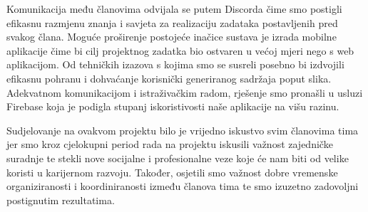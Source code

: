Komunikacija među članovima odvijala se putem Discorda čime smo postigli efikasnu razmjenu znanja i savjeta za realizaciju zadataka postavljenih pred svakog člana. Moguće proširenje postojeće inačice sustava je izrada mobilne aplikacije čime bi cilj projektnog zadatka
bio ostvaren u većoj mjeri nego s web aplikacijom. Od tehničkih izazova s kojima smo se susreli posebno bi izdvojili efikasnu pohranu i dohvaćanje korisnički generiranog sadržaja poput slika. Adekvatnom komunikacijom i istraživačkim radom, rješenje smo pronašli u usluzi Firebase koja je podigla stupanj iskoristivosti naše aplikacije na višu razinu.

Sudjelovanje na ovakvom projektu bilo je vrijedno iskustvo svim članovima
tima jer smo kroz cjelokupni period rada na projektu iskusili važnost zajedničke suradnje te stekli nove socijalne i profesionalne veze koje će nam biti od velike koristi u karijernom razvoju. Također, osjetili smo važnost dobre vremenske organiziranosti i koordiniranosti između članova tima te smo izuzetno zadovoljni postignutim rezultatima.
		\eject 